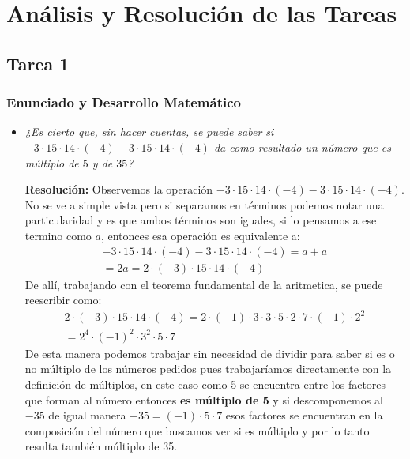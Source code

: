 \documentclass[11pt,a4paper]{article}
\begin{document}
\newpage

\section{Análisis y Resolución de las Tareas}

\subsection{Tarea 1}

\subsubsection{Enunciado y Desarrollo Matemático}
\begin{itemize}
    \item[a)] \textit{¿Es cierto que, sin hacer cuentas, se puede saber si $-3\cdot 15\cdot 14\cdot (-4) - 3\cdot 15\cdot 14\cdot (-4)$ da como resultado un número que es múltiplo de $5$ y de $35$?}
    
    \textbf{Resolución:}
    Observemos la operación $-3\cdot 15\cdot 14\cdot (-4) - 3\cdot 15\cdot 14\cdot (-4)$. No se ve a simple vista pero si separamos en términos podemos notar una particularidad y es que ambos términos son iguales, si lo pensamos a ese termino como $a$, entonces esa operación es equivalente a:
    \begin{gather*}
        -3\cdot 15\cdot 14\cdot (-4) - 3\cdot 15\cdot 14\cdot (-4)=a+a\\
        =2a=2 \cdot (-3)\cdot 15\cdot 14\cdot (-4)
    \end{gather*}
    De allí, trabajando con el teorema fundamental de la aritmetica, se puede reescribir como:
    \begin{gather*}
        2 \cdot (-3)\cdot 15\cdot 14\cdot (-4)= 2  \cdot (-1) \cdot 3 \cdot 3 \cdot 5\cdot 2 \cdot 7 \cdot (-1) \cdot 2^2\\
        =2^4 \cdot (-1)^2 \cdot 3^2 \cdot 5 \cdot 7
    \end{gather*}
    De esta manera podemos trabajar sin necesidad de dividir para saber si es o no múltiplo de los números pedidos pues trabajaríamos directamente con la definición de múltiplos, en este caso como 5 se encuentra entre los factores que forman al número entonces \textbf{es múltiplo de 5} y si descomponemos al $-35$ de igual manera $-35=(-1)\cdot 5 \cdot 7$ esos factores se encuentran en la composición del número que buscamos ver si es múltiplo y por lo tanto resulta también múltiplo de 35.   


\end{itemize}
\end{document}
